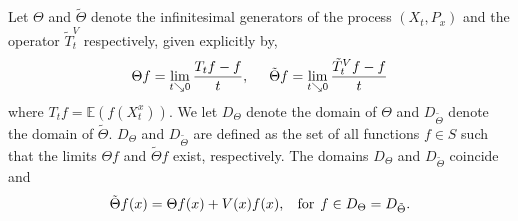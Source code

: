 \documentclass[a4paper,12pt,draft]{report}
\theoremstyle{remark}
\theoremstyle{definition}
\begin{document}
Let $\Theta$ and $\tilde{\Theta}$ denote the infinitesimal generators of the process $(X_t, P_x)$ and the operator $\tilde{T}_t^V$ respectively, given explicitly by,
$$
\Theta f = \lim_{t \searrow 0}\frac{T_tf - f}{t}, \hspace{0.5cm} \tilde{\Theta}f = \lim_{t \searrow 0}\frac{\tilde{T}_t^Vf - f}{t}
$$
where $T_tf = \mathbb{E}(f(X_t^x))$.  We let $D_\Theta$ denote the domain of $\Theta$ and $D_{\tilde{\Theta}}$ denote the domain of $\tilde{\Theta}$.  $D_\Theta$ and $D_{\tilde{\Theta}}$ are defined as the set of all functions $f \in S$ such that the limits $\Theta f$ and $\tilde{\Theta}f$ exist, respectively.
\lemma
{
The domains $D_\Theta$ and $D_{\tilde{\Theta}}$ coincide and
$$
\tilde{\Theta} f(x) = \Theta f(x) + V(x)f(x), \hspace{0.3cm} \text{for} \hspace{0.15cm} f \in D_\Theta = D_{\tilde{\Theta}}.
$$
}
\proof
\end{document}

